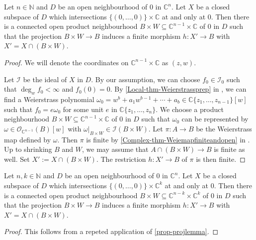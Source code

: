 \begin{proposition}\label{prop-projlemma}
    Let $n\in \mathbb{N}$ and $D$ be an open neighbourhood of $0$ in $\mathbb{C}^n$. 
    Let $X$ be a closed subspace of $D$ which intersections $\{(0,\ldots,0)\}\times \mathbb{C}$ at and only at $0$. Then there is a connected open product neighbourhood $B\times W\subseteq \mathbb{C}^{n-1}\times \mathbb{C}$ of $0$ in $D$ such that  the projection $B\times W\rightarrow B$ induces a finite morphism $h:X'\rightarrow B$ with $X'=X\cap (B\times W)$.
\end{proposition}
\begin{proof}
    We will denote the coordinates on $\mathbb{C}^{n-1}\times \mathbb{C}$ as $(z,w)$.

    Let $\mathcal{I}$ be the ideal of $X$ in $D$. By our assumption, we can choose $f_0\in \mathcal{I}_0$ such that $\deg_w f_0<\infty$ and $f_0(0)=0$. By \cref{Local-thm-Weierstrassprep} in , we can find a Weierstrass polynomial $\omega_0=w^b+a_1w^{b-1}+\cdots+a_b\in \mathbb{C}\{ z_1,\ldots,z_{n-1} \}[w]$ such that $f_0=e\omega_0$ for some unit $e$ in $\mathbb{C}\{ z_1,\ldots,z_{n} \}$. We choose a product neighbourhood $B\times W\subseteq \mathbb{C}^{n-1}\times \mathbb{C}$ of $0$ in $D$ such that $\omega_0$ can be represented by $\omega\in \mathcal{O}_{\mathbb{C}^{n-1}}(B)[w]$ with $\omega|_{B\times W}\in \mathcal{I}(B\times W)$. Let $\pi:A\rightarrow B$ be the Weierstrass map defined by $\omega$. Then $\pi$ is finite by \cref{Complex-thm-Weiemapfiniteandopen} in . 
    Up to shrinking $B$ and $W$, we may assume that $A\cap (B\times W)\rightarrow B$ is finite as well. Set $X':=X\cap (B\times W)$. The restriction $h:X'\rightarrow B$ of $\pi$ is then finite.
\end{proof}

\begin{corollary}\label{cor-projlemma}
    Let $n,k\in \mathbb{N}$ and $D$ be an open neighbourhood of $0$ in $\mathbb{C}^n$. 
    Let $X$ be a closed subspace of $D$ which intersections $\{(0,\ldots,0)\}\times \mathbb{C}^k$ at and only at $0$. Then there is a connected open product neighbourhood $B\times W\subseteq \mathbb{C}^{n-k}\times \mathbb{C}^k$ of $0$ in $D$ such that the projection $B\times W\rightarrow B$ induces a finite morphism $h:X'\rightarrow B$ with $X'=X\cap (B\times W)$.
\end{corollary}
\begin{proof}
    This follows from a repeted application of \cref{prop-projlemma}.
\end{proof}

